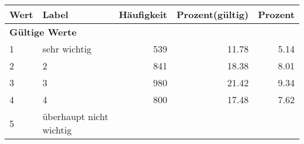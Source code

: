      \begin{longtable}{lXrrr}
     \toprule
     \textbf{Wert} & \textbf{Label} & \textbf{Häufigkeit} & \textbf{Prozent(gültig)} & \textbf{Prozent} \\
     \endhead
     \midrule
     \multicolumn{5}{l}{\textbf{Gültige Werte}}\\

     1 &
     \multicolumn{1}{X}{ sehr wichtig   } &


       \num{539} &
       \num[round-mode=places,round-precision=2]{11.78} &
         \num[round-mode=places,round-precision=2]{5.14} \\

     2 &
     \multicolumn{1}{X}{ 2   } &


       \num{841} &
       \num[round-mode=places,round-precision=2]{18.38} &
         \num[round-mode=places,round-precision=2]{8.01} \\

     3 &
     \multicolumn{1}{X}{ 3   } &


       \num{980} &
       \num[round-mode=places,round-precision=2]{21.42} &
         \num[round-mode=places,round-precision=2]{9.34} \\

     4 &
     \multicolumn{1}{X}{ 4   } &


       \num{800} &
       \num[round-mode=places,round-precision=2]{17.48} &
         \num[round-mode=places,round-precision=2]{7.62} \\

     5 &
     \multicolumn{1}{X}{ überhaupt nicht wichtig   } &



\end{longtable}

